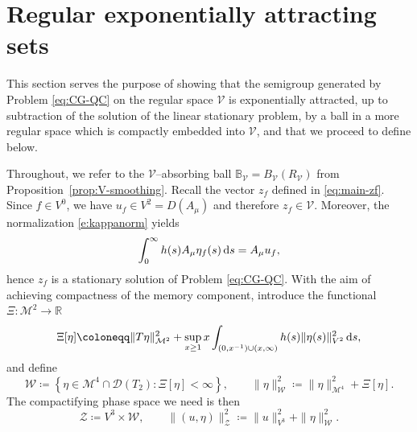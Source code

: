 \documentclass[12pt,leqno]{amsart}
\def\d{{\rm d}}
\theoremstyle{definition}
\numberwithin{equation}{section}
\numberwithin{figure}{section}
\begin{document}
\section{Regular exponentially attracting sets}\label{sec:reg-exp-attr}
This section serves the purpose of showing that the semigroup generated by Problem \eqref{eq:CG-QC} on the regular space $\mathcal V$ is exponentially attracted, up to subtraction of the solution of the linear stationary problem, by a ball in a more regular space which is compactly embedded into $\mathcal V$, and that we proceed to define below.

Throughout, we refer to the $\mathcal V$--absorbing ball $\mathbb B_{\mathcal V}=B_{\mathcal V}(R_{\mathcal V})$
from Proposition~\ref{prop:V-smoothing}.
Recall the vector $z_f$ defined in \eqref{eq:main-zf}.  
Since $f\in V^0$, we have $u_f\in {V^2}=D(A_\mu)$ and therefore $z_f\in\mathcal V$.
Moreover, the normalization \eqref{e:kappanorm} yields
\[\int_0^\infty h(s)A_\mu\eta_f(s)\,\d s=A_\mu u_f,\] hence $z_f$ is a stationary solution of Problem \eqref{eq:CG-QC}.
With the aim of achieving compactness of the memory component, introduce the  functional $\Xi:\mathcal M^2\to \mathbb R$ 
\begin{equation}\label{eq:Xi-h-def}
\Xi[\eta]\coloneqq \|T\eta\|_{\mathcal M^2}^2
+\sup_{x\ge1} x\int_{(0,x^{-1})\cup(x,\infty)}  h(s)\|\eta(s)\|_{{V^2}}^2\,\d s,
\end{equation}
and define
\begin{equation}\label{eq:Wh-def}
\mathcal W\coloneqq \left\{\eta\in \mathcal M^4\cap \mathcal D(T_2):\Xi[\eta]<\infty\right\},
\qquad
\|\eta\|_{\mathcal W}^2\coloneqq \|\eta\|_{\mathcal M^4}^2+\Xi[\eta].
\end{equation}
The compactifying phase space we need is then
\begin{equation}\label{eq:Z-def}
\mathcal Z\coloneqq {V^3}\times \mathcal W,
\qquad
\|(u,\eta)\|_{\mathcal Z}^2\coloneqq \|u\|_{{V^3}}^2+\|\eta\|_{\mathcal W}^2.
\end{equation}
\end{document}
